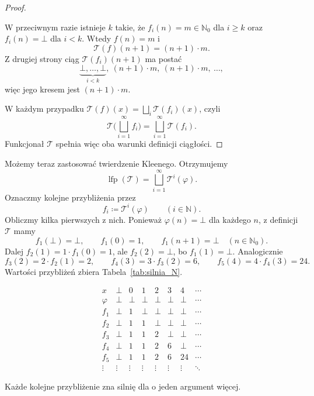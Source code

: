 \documentclass[11pt,a4paper]{article}
\theoremstyle{definition}
\theoremstyle{plain}
\newcommand{\bt}{\bot}                            %
\newcommand{\lfp}{\operatorname{lfp}}
\begin{document}
\begin{proof}
\begin{itemize}
		W przeciwnym razie istnieje $k$ takie, że $f_i(n)=m\in\mathbb N_0$
		dla $i\geq k$ oraz $f_i(n)=\bt$ dla $i<k$. Wtedy $f(n)=m$ i
		\[
		\mathcal T(f)(n+1)=(n+1)\cdot m.
		\]
		Z drugiej strony ciąg $\mathcal T(f_i)(n+1)$ ma postać
		\[
		\underbrace{\bt,\ldots,\bt}_{i<k},\ (n+1)\cdot m,\ (n+1)\cdot m,\ \ldots,
		\]
		więc jego kresem jest $(n+1)\cdot m$.
	\end{itemize}
	W każdym przypadku $\mathcal T(f)(x)=\bigsqcup_i\mathcal T(f_i)(x)$, czyli
	\[
	\mathcal T\Big(\bigsqcup_{i=1}^{\infty}f_i\Big)
	=
	\bigsqcup_{i=1}^{\infty}\mathcal T(f_i).
	\]
	Funkcjonał $\mathcal T$ spełnia więc oba warunki definicji ciągłości.
\end{proof}

Możemy teraz zastosować twierdzenie Kleenego. Otrzymujemy
\[
\lfp(\mathcal{T})
=
\bigsqcup_{i=1}^{\infty}\mathcal{T}^i(\varphi).
\]
Oznaczmy kolejne przybliżenia przez
\[
f_i\coloneqq \mathcal{T}^i(\varphi)
\qquad(i\in\mathbb N).
\]
Obliczmy kilka pierwszych z nich. Ponieważ $\varphi(n)=\bt$ dla każdego
$n$, z definicji $\mathcal T$ mamy
\[
f_1(\bt)=\bt,
\qquad
f_1(0)=1,
\qquad
f_1(n+1)=\bt\quad(n\in\mathbb N_0).
\]
Dalej $f_2(1)=1\cdot f_1(0)=1$, ale $f_2(2)=\bt$, bo $f_1(1)=\bt$.
Analogicznie
\[
f_3(2)=2\cdot f_2(1)=2,
\qquad
f_4(3)=3\cdot f_3(2)=6,
\qquad
f_5(4)=4\cdot f_4(3)=24.
\]
Wartości przybliżeń zbiera Tabela~\ref{tab:silnia_N}.
\begin{table}[H]
	\centering
	\[
	\begin{array}{c|ccccccc}
		x & \bt & 0 & 1 & 2 & 3 & 4 & \cdots\\
		\hline
		\varphi & \bt & \bt & \bt & \bt & \bt & \bt & \cdots\\
		f_1 & \bt & 1 & \bt & \bt & \bt & \bt & \cdots\\
		f_2 & \bt & 1 & 1 & \bt & \bt & \bt & \cdots\\
		f_3 & \bt & 1 & 1 & 2 & \bt & \bt & \cdots\\
		f_4 & \bt & 1 & 1 & 2 & 6 & \bt & \cdots\\
		f_5 & \bt & 1 & 1 & 2 & 6 & 24 & \cdots\\
		\vdots & \vdots & \vdots & \vdots & \vdots & \vdots & \vdots & \ddots
	\end{array}
	\]
	\caption{Kolejne przybliżenia $f_i=\mathcal T^{\,i}(\varphi)$ silni na zbiorze $D=\mathbb N_0\cup\{\bt\}$.}
	\label{tab:silnia_N}
\end{table}
Każde kolejne przybliżenie zna silnię dla o jeden argument więcej.
\end{document}
